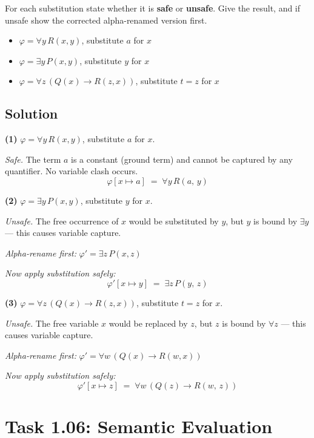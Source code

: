 \documentclass[11pt,a4paper]{article}
\newenvironment{solution}{%
	\begin{tcolorbox}[
		breakable,
		colback=green!4,
		colframe=green!50!black,
		fonttitle=\bfseries,
		title={ Solution},
		left=6pt, right=6pt, top=4pt, bottom=4pt
		]%
	}{%
	\end{tcolorbox}%
}
\begin{document}
For each substitution state whether it is \textbf{safe} or \textbf{unsafe}. Give the result, and if unsafe show the corrected alpha-renamed version first.

\begin{itemize}[itemindent=1em]
	\item $\varphi = \forall y\, R(x,y)$, substitute $a$ for $x$ 
	\item $\varphi = \exists y\, P(x,y)$, substitute $y$ for $x$
	\item $\varphi = \forall z\,(Q(x) \to R(z,x))$, substitute $t = z$ for $x$
\end{itemize}

\subsection*{Solution}
\begin{solution}
\textbf{(1)} $\varphi = \forall y\,R(x,y)$, substitute $a$ for $x$.

\textit{Safe.} The term $a$ is a constant (ground term) and cannot be captured by any quantifier. No variable clash occurs.
\[
\varphi[x \mapsto a] \;=\; \forall y\,R(a,\,y)
\]

\bigskip
\textbf{(2)} $\varphi = \exists y\,P(x,y)$, substitute $y$ for $x$.

\textit{Unsafe.} The free occurrence of $x$ would be substituted by $y$, but $y$ is bound by $\exists y$ — this causes variable capture.

\textit{Alpha-rename first:} $\varphi' = \exists z\,P(x,z)$

\textit{Now apply substitution safely:}
\[
\varphi'[x \mapsto y] \;=\; \exists z\,P(y,\,z)
\]

\bigskip
\textbf{(3)} $\varphi = \forall z\,(Q(x) \to R(z,x))$, substitute $t = z$ for $x$.

\textit{Unsafe.} The free variable $x$ would be replaced by $z$, but $z$ is bound by $\forall z$ — this causes variable capture.

\textit{Alpha-rename first:} $\varphi' = \forall w\,(Q(x) \to R(w,x))$

\textit{Now apply substitution safely:}
\[
\varphi'[x \mapsto z] \;=\; \forall w\,(Q(z) \to R(w,\,z))
\]
\end{solution}

\section*{Task 1.06: Semantic Evaluation}
\end{document}
